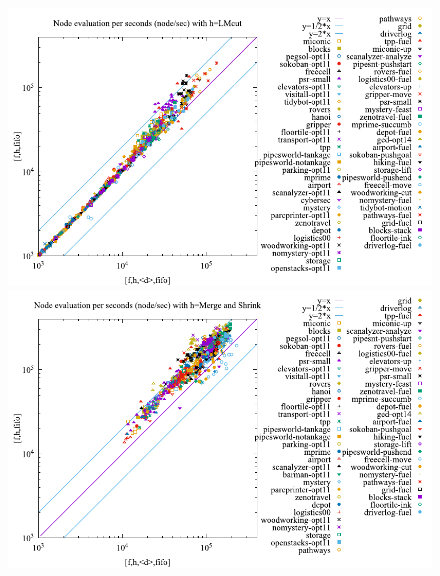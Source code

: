 \begin{figure}[htbp]
 \centering
 \includegraphics{img/node-sec/lmhiF-lmh_F.pdf}
 \includegraphics{img/node-sec/mnhiF-mnh_F.pdf}

\end{figure}
